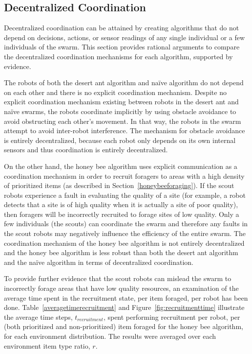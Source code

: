 \subsection{Decentralized Coordination}
\label{results:decentralizedcoordination}

Decentralized coordination can be attained by creating algorithms that do not depend on decisions, actions, or sensor readings of any single individual or a few individuals of the swarm. This section provides rational arguments to compare the decentralized coordination mechanisms for each algorithm, supported by evidence. 

The robots of both the desert ant algorithm and na\"ive algorithm do not depend on each other and there is no explicit coordination mechanism. Despite no explicit coordination mechanism existing between robots in the desert ant and na\"ive swarms, the robots coordinate implicitly by using obstacle avoidance to avoid obstructing each other's movement. In that way, the robots in the swarm attempt to avoid inter-robot interference. The mechanism for obstacle avoidance is entirely decentralized, because each robot only depends on its own internal sensors and thus coordination is entirely decentralized.

On the other hand, the honey bee algorithm uses explicit communication as a coordination mechanism in order to recruit foragers to areas with a high density of prioritized items (as described in Section~\ref{honeybeeforaging}). If the scout robots experience a fault in evaluating the quality of a site (for example, a robot detects that a site is of high quality when it is actually a site of poor quality), then foragers will be incorrectly recruited to forage sites of low quality. Only a few individuals (the scouts) can coordinate the swarm and therefore any faults in the scout robots may negatively influence the efficiency of the entire swarm. The coordination mechanism of the honey bee algorithm is not entirely decentralized and the honey bee algorithm is less robust than both the desert ant algorithm and the na\"ive algorithm in terms of decentralized coordination.

To provide further evidence that the scout robots can mislead the swarm to incorrectly forage areas that have low quality resources, an examination of the average time spent in the recruitment state, per item foraged, per robot has been done. Table~\ref{averagetimerecruitment} and Figure~\ref{fig:recruitmenttime} illustrate the average time steps, $t_{recruitment}$, spent performing recruitment per robot, per (both prioritized and non-prioritized) item foraged for the honey bee algorithm, for each environment distribution. The results were averaged over each environment item type ratio, $r$. 

